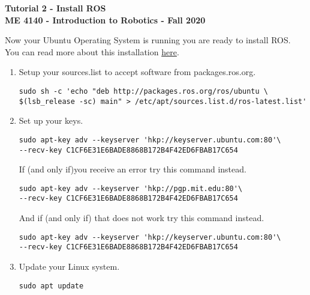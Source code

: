 \documentclass[12pt]{article}
\begin{document}
\thispagestyle{plain}

\begin{center}
	   {\bf \Large Tutorial 2 - Install ROS }\vspace{5mm} \\
   {\bf \large ME 4140 - Introduction to Robotics - Fall 2020} \vspace{2mm}\\
\end{center}



		{ Now your Ubuntu Operating System is running you are ready to install ROS. You can read more about this installation \href{http://wiki.ros.org/melodic/Installation/Ubuntu}{here}.}

\begin{enumerate}
	
	
	\item  Setup your sources.list to accept software from packages.ros.org.


	\begin{verbatim}
sudo sh -c 'echo "deb http://packages.ros.org/ros/ubuntu \
$(lsb_release -sc) main" > /etc/apt/sources.list.d/ros-latest.list'
	\end{verbatim}
	
	\item Set up your keys.  
	
	\begin{verbatim}
sudo apt-key adv --keyserver 'hkp://keyserver.ubuntu.com:80'\
--recv-key C1CF6E31E6BADE8868B172B4F42ED6FBAB17C654	
	\end{verbatim}	
	
	If (and only if)you receive an error try this command instead.
	\begin{verbatim}
sudo apt-key adv --keyserver 'hkp://pgp.mit.edu:80'\
--recv-key C1CF6E31E6BADE8868B172B4F42ED6FBAB17C654	
	\end{verbatim}
	
	And if (and only if) that does not work try this command instead.
	\begin{verbatim}
sudo apt-key adv --keyserver 'hkp://keyserver.ubuntu.com:80'\
--recv-key C1CF6E31E6BADE8868B172B4F42ED6FBAB17C654	
	\end{verbatim}		
	
	\item Update your Linux system. 
	
	\begin{verbatim}
sudo apt update
	\end{verbatim}	
	

\end{enumerate}
\end{document}

